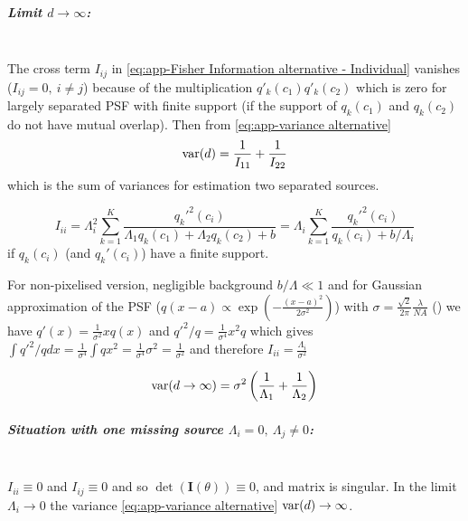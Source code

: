 \subparagraph*{Limit $d\rightarrow\infty$:}\ \\
The cross term $I_{ij}$ in \autoref{eq:app-Fisher Information alternative - Individual} vanishes ($I_{ij}=0,\: i\neq j$) because of the multiplication $q'_k(c_1)q'_k(c_2)$ which is zero for largely separated PSF with finite support (if the support of $q_k(c_1)$ and $q_k(c_2)$ do not have mutual overlap). Then from \autoref{eq:app-variance alternative} 
%
\begin{equation}
	\mathrm{var}(d)=\frac{1}{I_{11}}+\frac{1}{I_{22}}
\end{equation}
%
which is the sum of variances for estimation two separated sources.

\begin{equation}
	I_{ii}=\Lambda_i^2\sum_{k=1}^K\frac{q_k'^2(c_i)}{\Lambda_1q_k(c_1)+\Lambda_2q_k(c_2)+b}=\Lambda_i\sum_{k=1}^K\frac{q_k'^2(c_i)}{q_k(c_i)+b/\Lambda_i}
\end{equation}
%
if $q_k(c_i)$ (and $q_k'(c_i)$) have a finite support.

For non-pixelised version, negligible background $b/\Lambda\ll1$ and for Gaussian approximation of the PSF ($q(x-a)\propto\exp\left(-\frac{(x-a)^2}{2\sigma^2}\right)$) with
$\sigma=\frac{\sqrt{2}}{2\pi}\frac{\lambda}{NA}$ (\cite{Zhang2007}) we have $q'(x)=\frac{1}{\sigma^2}xq(x)$ and $q'^2/q=\frac{1}{\sigma^4}x^2q$ which gives $\int q'^2/qdx=\frac{1}{\sigma^4}\int qx^2=\frac{1}{\sigma^4}\sigma^2=\frac{1}{\sigma^2}$ and therefore $I_{ii}=\frac{\Lambda_i}{\sigma^2}$ 

\begin{equation}
	\mathrm{var}(d\rightarrow\infty) =\sigma^2\left(\frac{1}{\Lambda_1}+\frac{1}{\Lambda_2}\right)
\end{equation}

\subparagraph*{Situation with one missing source $\Lambda_i=0,\ \Lambda_j\neq0$:}\ \\
$I_{ii}\equiv0$ and $I_{ij}\equiv0$ and so $\det(\bm{I}(\theta))\equiv0$, and matrix is singular. In the limit $\Lambda_i\rightarrow0$ the
variance \autoref{eq:app-variance alternative} $\mathrm{var}(d)\rightarrow\infty$. 


